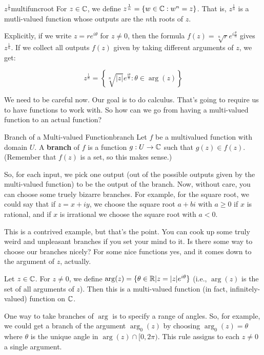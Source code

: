 \begin{defbo}{$z^{\frac{1}{n}}$}{multifuncroot}
For $z \in \mathbb{C}$, we define $z^{\frac{1}{n}} = \{w\in \mathbb{C}: w^n = z\}$. That is, $z^\frac{1}{n}$ is a mutli-valued function whose outputs are the $n$th roots of $z$.

Explicitly, if we write $z = re^{i\theta}$ for $z\ne 0$, then the formula $f(z) = \sqrt[n]{r}e^{i\frac{\theta}{n}}$ gives $z^\frac{1}{n}$. If we collect all outputs $f(z)$ given by taking different arguments of $z$, we get:

$$z^\frac{1}{n} = \left\{\sqrt[n]{|z|}e^\frac{i\theta}{n}: \theta\in\arg(z)\right\}$$

\end{defbo}


We need to be careful now. Our goal is to do calculus. That's going to require us to have functions to work with. So how can we go from having a multi-valued function to an actual function?

\begin{defbo}{Branch of a Multi-valued Function}{branch} 
Let $f$ be a multivalued function with domain $U$. A {\bf branch} of $f$ is a function $g:U\rightarrow \mathbb{C}$ such that $g(z) \in f(z)$. (Remember that $f(z)$ is a set, so this makes sense.)
\end{defbo}

So, for each input, we pick one output (out of the possible outputs given by the multi-valued function) to be the output of the branch. Now, without care, you can choose some truely bizarre branches. For example, for the square root, we could say that if $z = x + iy$, we choose the square root $a+ bi$ with $a \ge 0$ if $x$ is rational, and if $x$ is irrational we choose the square root with $a < 0$.

This is a contrived example, but that's the point. You can cook up some truly weird and unpleasant branches if you set your mind to it. Is there some way to choose our branches nicely? For some nice functions yes, and it comes down to the argument of $z$, actually.

\begin{ex}{}{} Let $z\in \mathbb{C}$. For $z\ne 0$, we define $\arg(z) = \{\theta\in \mathbb{R}| z = |z|e^{i\theta}\}$ (i.e., $\arg(z)$ is the set of all arguments of $z$). Then this is a multi-valued function (in fact, infinitely-valued) function on $\mathbb{C}$.

One way to take branches of $\arg$ is to specify a range of angles. So, for example, we could get a branch of the argument $\arg_0(z)$ by choosing $\arg_0(z) = \theta$ where $\theta$ is the unique angle in $\arg(z) \cap [0,2\pi)$. This rule assigns to each $z\ne 0$ a single argument.
\end{ex}

